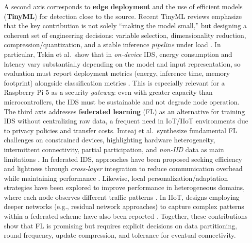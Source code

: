 A second axis corresponds to \textbf{edge deployment} and the use of efficient models (\textbf{TinyML}) for detection close to the source. Recent TinyML reviews emphasize that the key contribution is not solely ``making the model small,'' but designing a coherent set of engineering decisions: variable selection, dimensionality reduction, compression/quantization, and a stable inference \textit{pipeline} under load \cite{DuttaBharali2021_TinyMLSurvey}. In particular, Tekin et al.\ show that in \textit{on-device} IDS, energy consumption and latency vary substantially depending on the model and input representation, so evaluation must report deployment metrics (energy, inference time, memory footprint) alongside classification metrics \cite{Tekin2023_OnDeviceEnergy}. This is especially relevant for a Raspberry Pi 5 as a security \textit{gateway}: even with greater capacity than microcontrollers, the IDS must be sustainable and not degrade node operation.\\

The third axis addresses \textbf{federated learning} (FL) as an alternative for training IDS without centralizing raw data, a frequent need in IoT/IIoT environments due to privacy policies and transfer costs. Imteaj et al.\ synthesize fundamental FL challenges on constrained devices, highlighting hardware heterogeneity, intermittent connectivity, partial participation, and \textit{non-IID} data as main limitations \cite{Imteaj2022_FL_ResourceConstrainedSurvey}. In federated IDS, approaches have been proposed seeking efficiency and lightness through \textit{cross-layer} integration to reduce communication overhead while maintaining performance \cite{Hajj2023_CrossLayerFL_IDS}. Likewise, local personalization/adaptation strategies have been explored to improve performance in heterogeneous domains, where each node observes different traffic patterns \cite{Roy2023_FL_AdaptedModel}. In IIoT, designs employing deeper networks (e.g., residual network approaches) to capture complex patterns within a federated scheme have also been reported \cite{Chaurasia2024_FL_ResNet_IIoT}. Together, these contributions show that FL is promising but requires explicit decisions on data partitioning, round frequency, update compression, and tolerance for eventual connectivity.\\


